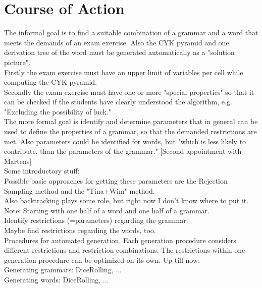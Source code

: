 
\section{Course of Action}\label{CourseOfAction}

The informal goal is to find a suitable combination of a grammar and a word that meets the demands of an exam exercise. Also the CYK pyramid and one derivation tree of the word must be generated automatically as a "solution picture".\\
Firstly the exam exercise must have an upper limit of variables per cell while computing the CYK-pyramid.\\
Secondly the exam exercise must have one or more "special properties" so that it can be checked if the students have clearly understood the algorithm, e.g. "Excluding the possibility of luck."\\

\noindent The more formal goal is identify and determine parameters that in general can be used to define the properties of a grammar, so that the demanded restrictions are met. Also parameters could be identified for words, but "which is less likely to contribute, than the parameters of the grammar." [Second appointment with Martens] \\

\noindent Some introductory stuff:\\


\noindent Possible basic approaches for getting these parameters are the Rejection Sampling method and the "Tina+Wim" method. \\
Also backtracking plays some role, but right now I don't know where to put it.  \\
Note: Starting with one half of a word and one half of a grammar.\\ 

\noindent Identify restrictions (=parameters) regarding the grammar.\\
Maybe find restrictions regarding the words, too.\\

\noindent Procedures for automated generation. Each generation procedure considers different restrictions and restriction combinations. The restrictions within one generation procedure can be optimized on its own. Up till now: \\
Generating grammars: DiceRolling, ...\\
Generating words: DiceRolling, ...\\

